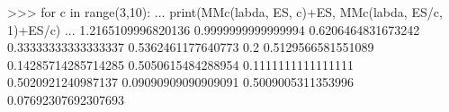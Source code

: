 
>>> for c in range(3,10):
...     print(MMc(labda, ES, c)+ES, MMc(labda, ES/c, 1)+ES/c)
...
1.2165109996820136 0.9999999999999994
0.6206464831673242 0.33333333333333337
0.5362461177640773 0.2
0.5129566581551089 0.14285714285714285
0.5050615484288954 0.1111111111111111
0.5020921240987137 0.09090909090909091
0.5009005311353996 0.07692307692307693

